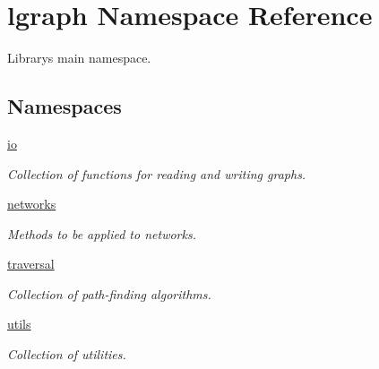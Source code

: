 \hypertarget{namespacelgraph}{}\section{lgraph Namespace Reference}
\label{namespacelgraph}


Library\textquotesingle{}s main namespace.  


\subsection*{Namespaces}
\begin{DoxyCompactItemize}
\item 
 \hyperlink{namespacelgraph_1_1io}{io}
\begin{DoxyCompactList}\small\item\em Collection of functions for reading and writing graphs. \end{DoxyCompactList}\item 
 \hyperlink{namespacelgraph_1_1networks}{networks}
\begin{DoxyCompactList}\small\item\em Methods to be applied to networks. \end{DoxyCompactList}\item 
 \hyperlink{namespacelgraph_1_1traversal}{traversal}
\begin{DoxyCompactList}\small\item\em Collection of path-\/finding algorithms. \end{DoxyCompactList}\item 
 \hyperlink{namespacelgraph_1_1utils}{utils}
\begin{DoxyCompactList}\small\item\em Collection of utilities. \end{DoxyCompactList}\end{DoxyCompactItemize}
